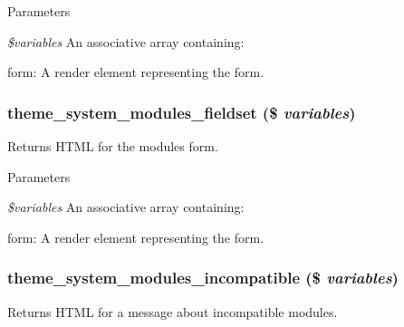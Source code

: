 \begin{DoxyParams}{Parameters}
\item[{\em \$variables}]An associative array containing:
\begin{DoxyItemize}
\item form: A render element representing the form. 
\end{DoxyItemize}\end{DoxyParams}
\hypertarget{group__themeable_gaeb3bb95c88bcc506c972e8bc92550ffa}{
\subsubsection[{theme\_\-system\_\-modules\_\-fieldset}]{\setlength{\rightskip}{0pt plus 5cm}theme\_\-system\_\-modules\_\-fieldset (\$ {\em variables})}}
\label{group__themeable_gaeb3bb95c88bcc506c972e8bc92550ffa}
Returns HTML for the modules form.


\begin{DoxyParams}{Parameters}
\item[{\em \$variables}]An associative array containing:
\begin{DoxyItemize}
\item form: A render element representing the form. 
\end{DoxyItemize}\end{DoxyParams}
\hypertarget{group__themeable_ga2b92c41a106a88c6adea84fc06bfeb55}{
\subsubsection[{theme\_\-system\_\-modules\_\-incompatible}]{\setlength{\rightskip}{0pt plus 5cm}theme\_\-system\_\-modules\_\-incompatible (\$ {\em variables})}}
\label{group__themeable_ga2b92c41a106a88c6adea84fc06bfeb55}
Returns HTML for a message about incompatible modules.


